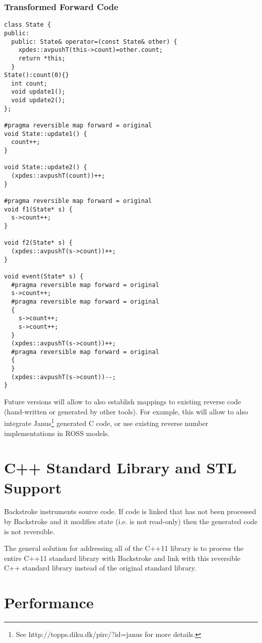 \documentclass[english,12pt, titlepage]{article}      %
\begin{document}
\subsubsection{Transformed Forward Code}
{
\footnotesize
\begin{verbatim}
class State {
public:
  public: State& operator=(const State& other) {
    xpdes::avpushT(this->count)=other.count;
    return *this;
  }
State():count(0){}
  int count;
  void update1();
  void update2();
};

#pragma reversible map forward = original
void State::update1() {
  count++;
}

void State::update2() {
  (xpdes::avpushT(count))++;
}

#pragma reversible map forward = original
void f1(State* s) {
  s->count++;
}

void f2(State* s) {
  (xpdes::avpushT(s->count))++;
}

void event(State* s) {
  #pragma reversible map forward = original
  s->count++;
  #pragma reversible map forward = original
  {
    s->count++;
    s->count++;
  }
  (xpdes::avpushT(s->count))++;
  #pragma reversible map forward = original
  {
  }
  (xpdes::avpushT(s->count))--;
}
\end{verbatim}
}

Future versions will allow to also establish mappings to existing
reverse code (hand-written or generated by other tools). For example,
this will allow to also integrate Janus\footnote{See
  http://topps.diku.dk/pirc/?id=janus for more details.} generated C
code, or use existing reverse number implementations in ROSS models.

\section{C++ Standard Library and STL Support}

Backstroke instruments source code. If code is linked that has not
been processed by Backstroke and it modifies state (i.e. is not
read-only) then the generated code is not reversible.

The general solution for addressing all of the C++11 library is to
process the entire C++11 standard library with Backstroke and link with
this reversible C++ standard library instead of the original standard
library.

\section{Performance}
\end{document}
